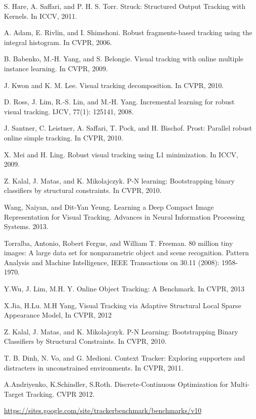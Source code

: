 \documentclass{acm_proc_article-sp}
\begin{document}
\begin{thebibliography}{99}
S. Hare, A. Saffari, and P. H. S. Torr. Struck: Structured Output Tracking with Kernels. In ICCV, 2011.

A. Adam, E. Rivlin, and I. Shimshoni. Robust fragments-based tracking using the integral histogram. In CVPR, 2006.

B. Babenko, M.-H. Yang, and S. Belongie. Visual tracking with online multiple instance learning. In CVPR, 2009.

J. Kwon and K. M. Lee. Visual tracking decomposition. In CVPR, 2010.

D. Ross, J. Lim, R.-S. Lin, and M.-H. Yang. Incremental learning for robust visual tracking. IJCV, 77(1): 125141, 2008.

J. Santner, C. Leistner, A. Saffari, T. Pock, and H. Bischof. Prost: Parallel robust online simple tracking. In CVPR, 2010.

X. Mei and H. Ling. Robust visual tracking using L1 minimization. In ICCV, 2009.

Z. Kalal, J. Matas, and K. Mikolajczyk. P-N learning: Bootstrapping binary classifiers by structural constraints. In CVPR, 2010.

Wang, Naiyan, and Dit-Yan Yeung. Learning a Deep Compact Image Representation for Visual Tracking. Advances in Neural Information Processing Systems. 2013.

Torralba, Antonio, Robert Fergus, and William T. Freeman. 80 million tiny images: A large data set for nonparametric object and scene recognition. Pattern Analysis and Machine Intelligence, IEEE Transactions on 30.11 (2008): 1958-1970.

Y.Wu, J. Lim, M.H. Y. Online Object Tracking: A Benchmark. In CVPR, 2013

X.Jia, H.Lu. M.H Yang, Visual Tracking via Adaptive Structural Local Sparse Appearance Model, In CVPR, 2012

Z. Kalal, J. Matas, and K. Mikolajczyk. P-N Learning: Bootstrapping Binary Classifiers by Structural Constraints. In CVPR, 2010.

T. B. Dinh, N. Vo, and G. Medioni. Context Tracker: Exploring supporters and distracters in unconstrained environments. In CVPR, 2011.

A.Andriyenko, K.Schindler, S.Roth. Discrete-Continuous Optimization for Multi-Target Tracking. CVPR 2012.


\url{https://sites.google.com/site/trackerbenchmark/benchmarks/v10}

\end{thebibliography}
\end{document}
